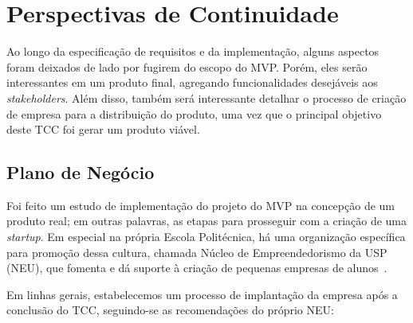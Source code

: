 \documentclass[]{politex}
\begin{document}
\section{Perspectivas de Continuidade}

Ao longo da especificação de requisitos e da implementação, alguns aspectos
foram deixados de lado por fugirem do escopo do MVP. Porém, eles serão
interessantes em um produto final, agregando funcionalidades desejáveis aos
\textit{stakeholders}. Além disso, também será interessante detalhar o processo
de criação de empresa para a distribuição do produto, uma vez que o principal
objetivo deste TCC foi gerar um produto viável.

\subsection{Plano de Negócio}

Foi feito um estudo de implementação do projeto do MVP na concepção de
um produto real; em outras palavras, as etapas para prosseguir com a criação
de uma \textit{startup}. Em especial na própria Escola Politécnica, há uma
organização específica para promoção dessa cultura, chamada Núcleo de
Empreendedorismo da USP (NEU), que fomenta e dá suporte à criação de pequenas
empresas de alunos~\cite{neu}.

Em linhas gerais, estabelecemos um processo de implantação da empresa após a
conclusão do TCC, seguindo-se as recomendações do próprio NEU:
\end{document}
